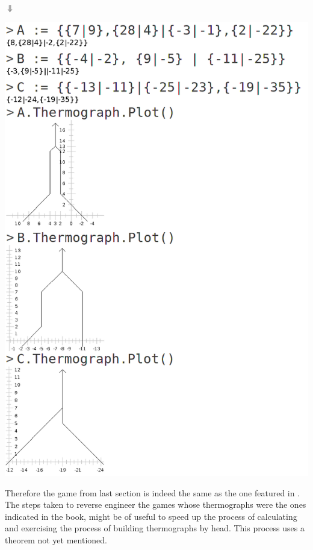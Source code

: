 \begingroup
{}%

\endgroup
\begin{center}
	$\Downarrow$
\end{center}
\begin{center}
\includegraphics[scale=0.3]{../images/resulting_thermographs.png}
\end{center}

Therefore the game from last section is indeed the same as the one featured in . The steps taken to reverse engineer the games whose thermographs were the ones indicated in the book, might be of useful to speed up the process of calculating and exercising the process of building thermographs by head. This process uses a theorem not yet mentioned.

